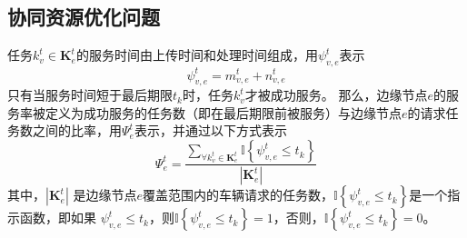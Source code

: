 \subsection{协同资源优化问题}

任务$k_v^t \in \mathbf{K}_{e}^{t}$的服务时间由上传时间和处理时间组成，用$\psi_{v, e}^{t}$表示
\begin{equation}
	\psi_{v, e}^{t} = m_{v, e}^{t} +  n_{v, e}^{t}
	\label{equ 4-10}
\end{equation}
只有当服务时间短于最后期限$t_k$时，任务$k_v^t$才被成功服务。
那么，边缘节点$e$的服务率被定义为成功服务的任务数（即在最后期限前被服务）与边缘节点$e$的请求任务数之间的比率，用$\Psi_{e}^{t}$表示，并通过以下方式表示
\begin{equation}
	\Psi_{e}^{t} = \frac{\sum_{\forall k_{v}^{t} \in \mathbf{K}_{e}^{t}} \mathbb{I} \left\{ \psi_{v, e}^{t} \leq t_{k} \right\} }{|\mathbf{K}_{e}^{t}|}
	\label{equ 4-11}
\end{equation}
\noindent 其中，$|\mathbf{K}_{e}^{t}|$ 是边缘节点$e$覆盖范围内的车辆请求的任务数，$\mathbb{I} \left\{ \psi_{v, e}^{t} \leq t_{k} \right\}$是一个指示函数，即如果 $\psi_{v, e}^{t} \leq t_{k}$，则$\mathbb{I} \left\{ \psi_{v, e}^{t} \leq t_{k} \right\} =1$，否则，$\mathbb{I} \left\{ \psi_{v, e}^{t} \leq t_{k} \right\} =0$。

